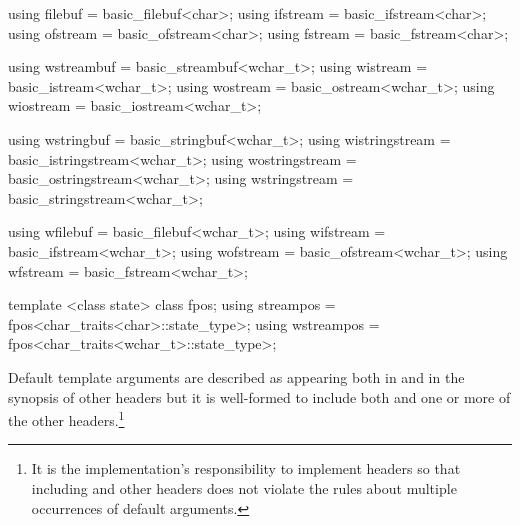 \begin{codeblock}
{  using filebuf  = basic_filebuf<char>;
  using ifstream = basic_ifstream<char>;
  using ofstream = basic_ofstream<char>;
  using fstream  = basic_fstream<char>;

  using wstreambuf = basic_streambuf<wchar_t>;
  using wistream   = basic_istream<wchar_t>;
  using wostream   = basic_ostream<wchar_t>;
  using wiostream  = basic_iostream<wchar_t>;

  using wstringbuf     = basic_stringbuf<wchar_t>;
  using wistringstream = basic_istringstream<wchar_t>;
  using wostringstream = basic_ostringstream<wchar_t>;
  using wstringstream  = basic_stringstream<wchar_t>;

  using wfilebuf  = basic_filebuf<wchar_t>;
  using wifstream = basic_ifstream<wchar_t>;
  using wofstream = basic_ofstream<wchar_t>;
  using wfstream  = basic_fstream<wchar_t>;

  template <class state> class fpos;
  using streampos  = fpos<char_traits<char>::state_type>;
  using wstreampos = fpos<char_traits<wchar_t>::state_type>;
}
\end{codeblock}

\pnum
Default template arguments are described as appearing both in
and in the synopsis of other headers
but it is well-formed to include both
and one or more of the other headers.\footnote{It is the implementation's
responsibility to implement headers so
that including
and other headers does not violate the rules about
multiple occurrences of default arguments.}

